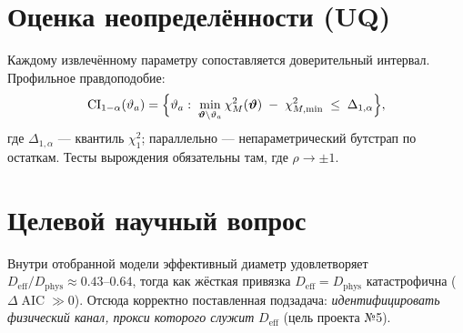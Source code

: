 \documentclass[11pt]{article}
\newcommand{\vth}{\bm{\vartheta}}
\newcommand{\Deff}{D_{\mathrm{eff}}}
\newcommand{\Dphys}{D_{\mathrm{phys}}}
\DeclareMathOperator{\AIC}{AIC}
\begin{document}
\section{Оценка неопределённости (UQ)}
Каждому извлечённому параметру сопоставляется доверительный интервал. Профильное правдоподобие:
\[
  \mathrm{CI}_{1-\alpha}(\vartheta_a)=\Bigl\{\vartheta_a:\;
  \min_{\vth\setminus\vartheta_a}\chi^2_M(\vth)\;-\;\chi^2_{M,\min}\;\le\;\Delta_{1,\alpha}\Bigr\},
\]
где $\Delta_{1,\alpha}$ — квантиль $\chi^2_1$; параллельно — непараметрический бутстрап по
остаткам. Тесты вырождения обязательны там, где $\rho\to\pm1$.

\section{Целевой научный вопрос}
Внутри отобранной модели эффективный диаметр удовлетворяет $\Deff/\Dphys\approx 0.43\text{--}0.64$,
тогда как жёсткая привязка $\Deff=\Dphys$ катастрофична ($\Delta\AIC\gg 0$). Отсюда корректно
поставленная подзадача: \emph{идентифицировать физический канал, прокси которого служит} $\Deff$
(цель проекта №5).
\end{document}
